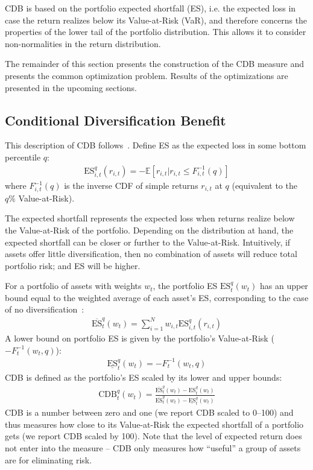 CDB is based on the portfolio expected shortfall (ES), i.e. the expected loss in case the return realizes below its Value-at-Risk (VaR), and therefore concerns the properties of the lower tail of the portfolio distribution. This allows it to consider non-normalities in the return distribution.

The remainder of this section presents the construction of the CDB measure and presents the common optimization problem. Results of the optimizations are presented in the upcoming sections.

\subsection{Conditional Diversification Benefit} %
\label{sub:conditional_diversification_benefit}

This description of CDB follows~\textcite{ChristoffersenErrunzaJacobLanglois2012}. Define ES as the expected loss in some bottom percentile $q$:
\begin{align}
    \text{ES}_{i,t}^q(r_{i,t}) = -\mathbb{E}[r_{i,t} | r_{i,t} \leq F_{i,t}^{-1}(q)]
\end{align}
where $F_{i,t}^{-1}(q)$ is the inverse CDF of simple returns $r_{i,t}$ at $q$ (equivalent to the $q\%$ Value-at-Risk). 

The expected shortfall represents the expected loss when returns realize below the Value-at-Risk of the portfolio. Depending on the distribution at hand, the expected shortfall can be closer or further to the Value-at-Risk. Intuitively, if assets offer little diversification, then no combination of assets will reduce total portfolio risk; and ES will be higher. 

For a portfolio of assets with weights $w_t$, the portfolio ES $\text{ES}_t^q(w_t)$ has an upper bound equal to the weighted average of each asset's ES, corresponding to the case of no diversification~\autocite{Artzner1999}:
\begin{align}
  \overline{\text{ES}}_t^q(w_t) = \sum_{i=1}^N w_{i,t} \text{ES}_{i,t}^q(r_{i,t})
\end{align}
A lower bound on portfolio ES is given by the portfolio's Value-at-Risk ($-F_{t}^{-1}(w_t, q)$):
\begin{align}
  \underline{\text{ES}}_t^q(w_t) = -F_{t}^{-1}(w_t, q)
\end{align}
CDB is defined as the portfolio's ES scaled by its lower and upper bounds:
\begin{align}
  \text{CDB}_t^q(w_t) = \frac{\overline{\text{ES}}_t^q(w_t) - \text{ES}_t^q(w_t)}{\overline{\text{ES}}_t^q(w_t) - \underline{\text{ES}}_t^q(w_t)}
\end{align}
CDB is a number between zero and one (we report CDB scaled to 0--100) and thus measures how close to its Value-at-Risk the expected shortfall of a portfolio gets (we report CDB scaled by 100). Note that the level of expected return does not enter into the measure -- CDB only measures how ``useful'' a group of assets are for eliminating risk.

